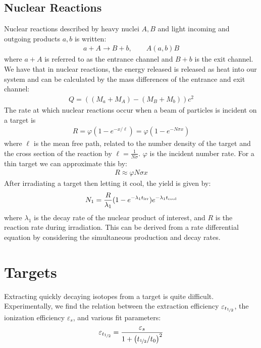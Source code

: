 \documentclass{article}
\numberwithin{equation}{section}
\begin{document}
\subsection{Nuclear Reactions}
Nuclear reactions described by heavy nuclei $A,B$ and light incoming and outgoing products $a,b$ is written:
\begin{align}
a+A \rightarrow B+ b ,\qquad A(a,b)B
\end{align}
where $a+A$ is referred to as the entrance channel and $B+b$ is the exit channel. We have that in nuclear reactions, the energy released is released as heat into our system and can be calculated by the mass differences of the entrance and exit channel:
\begin{align}
Q = \left( (M_a + M_A) - (M_B + M_b) \right) c^2
\end{align}
The rate at which nuclear reactions occur when a beam of particles is incident on a target is 
\begin{align}
R = \varphi(1- e^{-x / \ell}) = \varphi(1- e^{-N \sigma x})
\end{align}
where $\ell$ is the mean free path, related to the number density of the target and the cross section of the reaction by $\ell = \frac{1}{N \sigma}$. $\varphi$ is the incident number rate. For a thin target we can approximate this by:
\begin{align}
R \approx \varphi N \sigma x 
\end{align}
After irradiating a target then letting it cool, the yield is given by:
\begin{align}
N_1 = \frac{R}{\lambda_1} (1 - e^{-\lambda_1 t_{\rm irr}})e^{-\lambda_1 t_{\rm cool}}
\end{align}
where $\lambda_1$ is the decay rate of the nuclear product of interest, and $R$ is the reaction rate during irradiation. This can be derived from a rate differential equation by considering the simultaneous production and decay rates.

\section{Targets}
Extracting quickly decaying isotopes from a target is quite difficult. Experimentally, we find the relation between the extraction efficiency $\varepsilon_{t_{\nicefrac{1}{2}}}$, the ionization efficiency $\varepsilon_s$, and various fit parameters:
\begin{align}
\varepsilon_{t_{\nicefrac{1}{2}}} = \frac{\varepsilon_s}{1+ \left(t_{\nicefrac{1}{2}}/t_0\right)^2}
\end{align}
\end{document}
